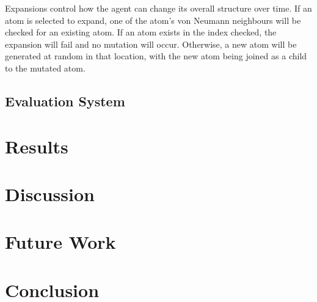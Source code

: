 \documentclass[runningheads]{llncs}
\begin{document}
Expansions control how the agent can change its overall structure over time.
If an atom is selected to expand, one of the atom's von Neumann neighbours will be checked for an existing atom.
If an atom exists in the index checked, the expansion will fail and no mutation will occur.
Otherwise, a new atom will be generated at random in that location, with the new atom being joined as a child to the mutated atom.

\subsection{Evaluation System}

\section{Results}

\section{Discussion}

\section{Future Work}

\section{Conclusion}
\end{document}
